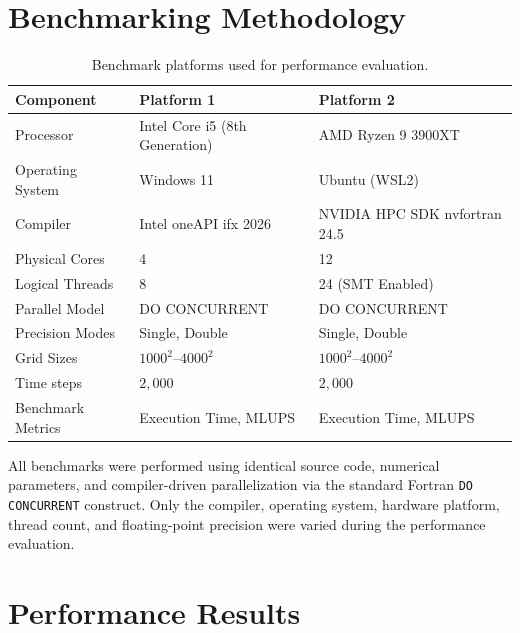 \documentclass[11pt,a4paper]{article}
\begin{document}
	
	\section{Benchmarking Methodology}
	\label{sec:methodology}
	
\begin{table}[h]
	\centering
	\caption{Benchmark platforms used for performance evaluation.}
	\label{tab:benchmark_platform}
	\begin{tabular}{lll}
		\hline
		\textbf{Component} & \textbf{Platform 1} & \textbf{Platform 2} \\
		\hline
		Processor & Intel Core i5 (8th Generation) & AMD Ryzen 9 3900XT \\
		Operating System & Windows 11 & Ubuntu (WSL2) \\
		Compiler & Intel oneAPI ifx 2026 & NVIDIA HPC SDK nvfortran 24.5 \\
		Physical Cores & 4 & 12 \\
		Logical Threads & 8 & 24 (SMT Enabled) \\
		Parallel Model & DO CONCURRENT & DO CONCURRENT \\
		Precision Modes & Single, Double & Single, Double \\
		Grid Sizes & $1000^2$--$4000^2$ & $1000^2$--$4000^2$ \\
		Time steps & $2,000$ & $2,000$ \\
		Benchmark Metrics & Execution Time, MLUPS & Execution Time, MLUPS \\
		\hline
	\end{tabular}
\end{table}

All benchmarks were performed using identical source code, numerical parameters, and compiler-driven parallelization via the standard Fortran \texttt{DO CONCURRENT} construct. Only the compiler, operating system, hardware platform, thread count, and floating-point precision were varied during the performance evaluation.




	\section{Performance Results}
\label{sec:results}
	
\end{document}
